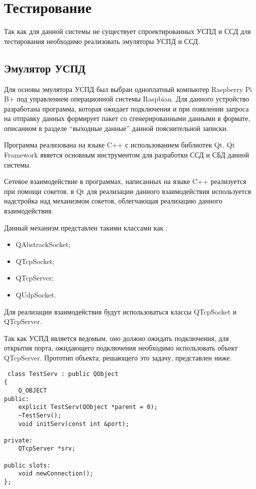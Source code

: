 \newpage
\section{Тестирование}
\setcounter{figure}{0}

Так как для данной системы не существует спроектированных УСПД и ССД для тестирования необходимо реализовать эмуляторы УСПД и ССД. 

\subsection{Эмулятор УСПД}

Для основы эмулятора УСПД был выбран одноплатный компьютер Raspberry Pi B+ под управлением операционной системы Raspbian. Для данного устройство разработана программа, которая ожидает подключения и при появлении запроса на отправку данных формирует пакет со сгенерированными данными в формате, описанном в разделе ``выходные данные'' данной пояснительной записки.

Программа реализована на языке C++ с использованием библиотек Qt. Qt Framework явяется основным инструментом для разработки ССД и СБД данной системы.

Сетевое взаимодействие в программах, написанных на языке C++ реализуется при помощи сокетов\cite{cpp}, в Qt для реализации данного взаимодействия используется надстройка над механизмом сокетов, облегчающая реализацию данного взаимодействия.

Данный механизм представлен такими классами как \cite{qt}:
\begin{itemize}
 \item QAbstrackSocket;
 \item QTcpSocket;
 \item QTcpServer;
 \item QUdpSocket.
\end{itemize}

Для реализации взаимодействия будут использоваться классы QTcpSocket и QTcpServer.

Так как УСПД является ведомым, оно должно ожидать подключения, для открытия порта, ожидающего подключения необходимо использовать объект QTcpServer. Прототип объекта, решающего это задачу, представлен ниже.

\begin{lstlisting}
 class TestServ : public QObject
{
    Q_OBJECT
public:
    explicit TestServ(QObject *parent = 0);
    ~TestServ();
    void initServ(const int &port);

private:
    QTcpServer *srv;

public slots:
    void newConnection();
};
\end{lstlisting}

